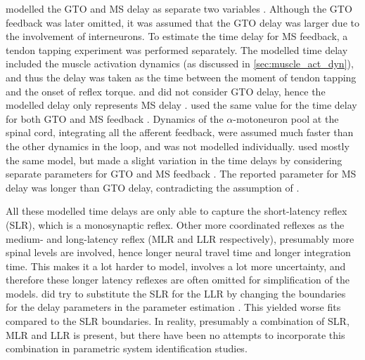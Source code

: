 \citeauthor{zhang_simultaneous_1997} modelled the GTO and MS delay as separate two variables \cite{zhang_simultaneous_1997}. Although the GTO feedback was later omitted, it was assumed that the GTO delay was larger due to the involvement of interneurons. To estimate the time delay for MS feedback, a tendon tapping experiment was performed separately. The modelled time delay included the muscle activation dynamics (as discussed in \autoref{sec:muscle_act_dyn}), and thus the delay was taken as the time between the moment of tendon tapping and the onset of reflex torque. \citeauthor{mirbagheri_intrinsic_2000} and \citeauthor{van_der_helm_identification_2002} did not consider GTO delay, hence the modelled delay only represents MS delay \cite{mirbagheri_intrinsic_2000, van_der_helm_identification_2002}. \citeauthor{schouten_nmclab_2008} used the same value for the time delay for both GTO and MS feedback \cite{schouten_nmclab_2008}. Dynamics of the $\alpha$-motoneuron pool at the spinal cord, integrating all the afferent feedback, were assumed much faster than the other dynamics in the loop, and was not modelled individually. \citeauthor{mugge_rigorous_2010} used mostly the same model, but made a slight variation in the time delays by considering separate parameters for GTO and MS feedback \cite{mugge_rigorous_2010}. The reported parameter for MS delay was longer than GTO delay, contradicting the assumption of \citeauthor{zhang_simultaneous_1997}. 

All these modelled time delays are only able to capture the short-latency reflex (SLR), which is a monosynaptic reflex. Other more coordinated reflexes as the medium- and long-latency reflex (MLR and LLR respectively), presumably more spinal levels are involved, hence longer neural travel time and longer integration time. This makes it a lot harder to model, involves a lot more uncertainty, and therefore these longer latency reflexes are often omitted for simplification of the models. \citeauthor{mugge_rigorous_2010} did try to substitute the SLR for the LLR by changing the boundaries for the delay parameters in the parameter estimation \cite{mugge_rigorous_2010}. This yielded worse fits compared to the SLR boundaries. In reality, presumably a combination of SLR, MLR and LLR is present, but there have been no attempts to incorporate this combination in parametric system identification studies. 

